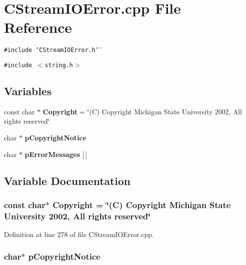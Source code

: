 \section{CStream\-IOError.cpp File Reference}
\label{CStreamIOError_8cpp}
{\tt \#include \char`\"{}CStream\-IOError.h\char`\"{}}\par
{\tt \#include $<$string.h$>$}\par
\subsection*{Variables}
\begin{CompactItemize}
\item 
const char $\ast$ {\bf Copyright} = \char`\"{}(C) Copyright Michigan State University 2002, All rights reserved\char`\"{}
\item 
char $\ast$ {\bf p\-Copyright\-Notice}
\item 
char $\ast$ {\bf p\-Error\-Messages} [$\,$]
\end{CompactItemize}


\subsection{Variable Documentation}
\subsubsection{\setlength{\rightskip}{0pt plus 5cm}const char$\ast$ Copyright = \char`\"{}(C) Copyright Michigan State University 2002, All rights reserved\char`\"{}\hspace{0.3cm}{\tt  [static]}}\label{CStreamIOError_8cpp_a0}




Definition at line 278 of file CStream\-IOError.cpp.
\subsubsection{\setlength{\rightskip}{0pt plus 5cm}char$\ast$ p\-Copyright\-Notice\hspace{0.3cm}{\tt  [static]}}\label{CStreamIOError_8cpp_a1}



